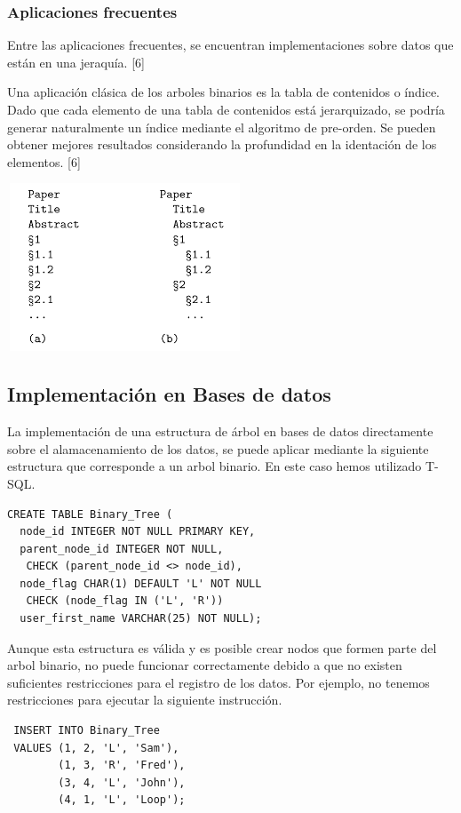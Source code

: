 \documentclass[twoside,twocolumn]{article}
\begin{document}
\subsubsection{Aplicaciones frecuentes}

Entre las aplicaciones frecuentes, se encuentran implementaciones sobre datos que están en una jeraquía. [6]

Una aplicación clásica de los arboles binarios es la tabla de contenidos o índice. Dado que cada elemento de una tabla de contenidos está jerarquizado, se podría generar naturalmente un índice mediante el algoritmo de pre-orden. Se pueden obtener mejores resultados considerando la profundidad en la identación de los elementos. [6]

\includegraphics[width=7cm, height=5cm]{img/Screenshot_4.png}

\subsection{Implementación en Bases de datos}
La implementación de una estructura de árbol en bases de datos directamente sobre el alamacenamiento de los datos, se puede aplicar mediante la siguiente estructura que corresponde a un arbol binario. En este caso hemos utilizado T-SQL.

\begin{lstlisting}
CREATE TABLE Binary_Tree (
  node_id INTEGER NOT NULL PRIMARY KEY,
  parent_node_id INTEGER NOT NULL,
   CHECK (parent_node_id <> node_id),
  node_flag CHAR(1) DEFAULT 'L' NOT NULL
   CHECK (node_flag IN ('L', 'R'))
  user_first_name VARCHAR(25) NOT NULL);
\end{lstlisting}

Aunque esta estructura es válida y es posible crear nodos que formen parte del arbol binario, no puede funcionar correctamente debido a que no existen suficientes restricciones para el registro de los datos. Por ejemplo, no tenemos restricciones para ejecutar la siguiente instrucción.

\begin{lstlisting}
 INSERT INTO Binary_Tree
 VALUES (1, 2, 'L', 'Sam'),
        (1, 3, 'R', 'Fred'),
        (3, 4, 'L', 'John'),
        (4, 1, 'L', 'Loop');
\end{lstlisting}
\end{document}
